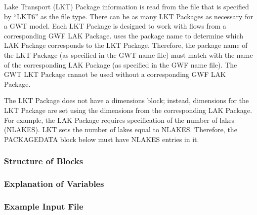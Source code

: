 Lake Transport (LKT) Package information is read from the file that is specified by ``LKT6'' as the file type.  There can be as many LKT Packages as necessary for a GWT model. Each LKT Package is designed to work with flows from a corresponding GWF LAK Package. \mf uses the package name to determine which LAK Package corresponds to the LKT Package.  Therefore, the package name of the LKT Package (as specified in the GWT name file) must match with the name of the corresponding LAK Package (as specified in the GWF name file).  The GWT LKT Package cannot be used without a corresponding GWF LAK Package.

The LKT Package does not have a dimensions block; instead, dimensions for the LKT Package are set using the dimensions from the corresponding LAK Package.  For example, the LAK Package requires specification of the number of lakes (NLAKES).  LKT sets the number of lakes equal to NLAKES.  Therefore, the PACKAGEDATA block below must have NLAKES entries in it.

\vspace{5mm}
\subsubsection{Structure of Blocks}




\vspace{5mm}
\subsubsection{Explanation of Variables}
\begin{description}

\end{description}

\vspace{5mm}
\subsubsection{Example Input File}


